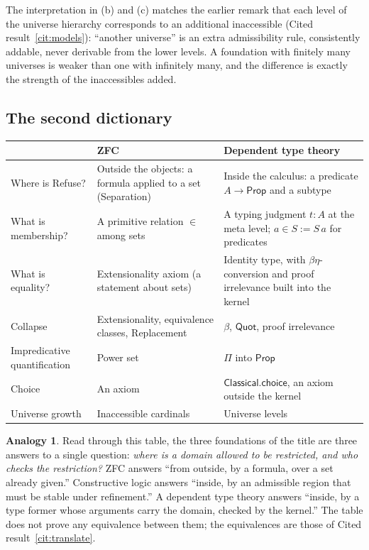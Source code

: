 \documentclass[11pt]{article}
\newcommand{\Prop}{\mathsf{Prop}}
\newcommand{\Quot}{\mathsf{Quot}}
\theoremstyle{definition}
\newtheorem{analogy}[definition]{Analogy}
\theoremstyle{plain}
\theoremstyle{remark}
\begin{document}
The interpretation in (b) and (c) matches the earlier remark that each level of the universe hierarchy corresponds to an additional inaccessible (Cited result~\ref{cit:models}): ``another universe'' is an extra admissibility rule, consistently addable, never derivable from the lower levels. A foundation with finitely many universes is weaker than one with infinitely many, and the difference is exactly the strength of the inaccessibles added.

\subsection{The second dictionary}

\begin{center}
\begin{tabular}{@{}p{}p{}p{}@{}}
\toprule
 & ZFC & Dependent type theory\\
\midrule
Where is Refuse? & Outside the objects: a formula applied to a set (Separation) & Inside the calculus: a predicate $A\to\Prop$ and a subtype\\
What is membership? & A primitive relation $\in$ among sets & A typing judgment $t:A$ at the meta level; $a\in S:=S\,a$ for predicates\\
What is equality? & Extensionality axiom (a statement about sets) & Identity type, with $\beta\eta$-conversion and proof irrelevance built into the kernel\\
Collapse & Extensionality, equivalence classes, Replacement & $\beta$, $\Quot$, proof irrelevance\\
Impredicative quantification & Power set & $\Pi$ into $\Prop$\\
Choice & An axiom & $\mathsf{Classical.choice}$, an axiom outside the kernel\\
Universe growth & Inaccessible cardinals & Universe levels\\
\bottomrule
\end{tabular}
\end{center}

\begin{analogy}\label{an:dict2}
Read through this table, the three foundations of the title are three answers to a single question: \emph{where is a domain allowed to be restricted, and who checks the restriction?} ZFC answers ``from outside, by a formula, over a set already given.'' Constructive logic answers ``inside, by an admissible region that must be stable under refinement.'' A dependent type theory answers ``inside, by a type former whose arguments carry the domain, checked by the kernel.'' The table does not prove any equivalence between them; the equivalences are those of Cited result~\ref{cit:translate}.
\end{analogy}
\end{document}
